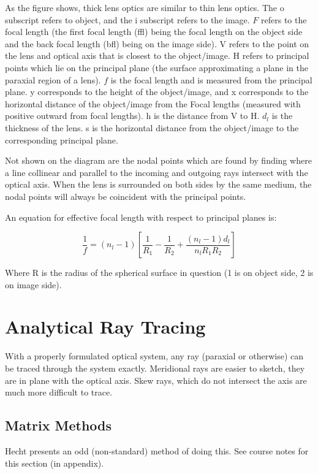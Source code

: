 \documentclass[12pt]{report}
\begin{document}
As the figure shows, thick lens optics are similar to thin lens optics. The o subscript refers to object, and the i subscript refers to the image. $F$ refers to the focal length (the first focal length (ffl) being the focal length on the object side and the back focal length (bfl) being on the image side). V refers to the point on the lens and optical axis that is closest to the object/image. H refers to principal points which lie on the principal plane (the surface approximating a plane in the paraxial region of a lens). $f$ is the focal length and is measured from the principal plane. y corresponds to the height of the object/image,  and x corresponds to the horizontal distance of the object/image from the Focal lengths (measured with positive outward from focal lengths). h is the distance from V to H. $d_l$ is the thickness of the lens. s is the horizontal distance from the object/image to the corresponding principal plane. 

Not shown on the diagram are the nodal points which are found by finding where a line collinear and parallel to the incoming and outgoing rays intersect with the optical axis. When the lens is surrounded on both sides by the same medium, the nodal points will always be coincident with the principal points. 

An equation for effective focal length with respect to principal planes is:

\begin{equation}
\frac{1}{f} = (n_l - 1) \left[\frac{1}{R_1} - \frac{1}{R_2} + \frac{(n_l-1)d_l}{n_lR_1R_2}\right]
\end{equation}

Where R is the radius of the spherical surface in question (1 is on object side, 2 is on image side). 

\section{Analytical Ray Tracing}
With a properly formulated optical system, any ray (paraxial or otherwise) can be traced through the system exactly. Meridional rays are easier to sketch, they are in plane with the optical axis. Skew rays, which do not intersect the axis are much more difficult to trace. 
\subsection{Matrix Methods}
Hecht presents an odd (non-standard) method of doing this. See course notes for this section (in appendix).
\end{document}
